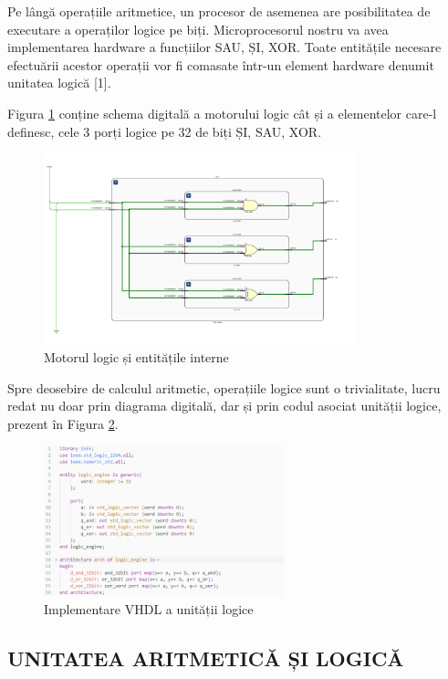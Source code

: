 \documentclass[12pt]{article}
\begin{document}
 Pe lângă operațiile aritmetice, un procesor de asemenea are posibilitatea de executare a operaților logice pe biți. Microprocesorul nostru va avea implementarea hardware a funcțiilor SAU, ȘI, XOR. Toate entitățile necesare efectuării acestor operații vor fi comasate într-un element hardware denumit unitatea logică [1].
 
Figura \ref{Figura:20} conține schema digitală a motorului logic cât și a elementelor care-l definesc, cele 3 porți logice pe 32 de biți ȘI, SAU, XOR.
  \begin{figure}[h!]
 \includegraphics[width=0.81\textwidth]{LogicEngine.png}
 \centering
 \caption{Motorul logic și entitățile interne}
 \label{Figura:20}
 \end{figure}

Spre deosebire de calculul aritmetic, operațiile logice sunt o trivialitate, lucru redat nu doar prin diagrama digitală, dar și prin codul asociat unității logice, prezent în Figura \ref{Figura:27}.

 \begin{figure}[h!]
 \includegraphics[width=0.62\textwidth]{logicengineVHDL.png}
 \centering
 \caption{Implementare VHDL a unității logice}
 \label{Figura:27}
 \end{figure}
 
\newpage
\subsection{UNITATEA ARITMETICĂ ȘI LOGICĂ}
\end{document}
